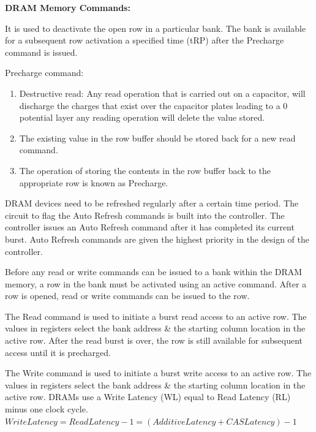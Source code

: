 \textbf{DRAM Memory Commands:}
\begin{description}
    \item [Precharge Command] It is used to deactivate the open row in a particular bank. The bank is available for a subsequent row activation a specified time (tRP) after the Precharge command is issued. 
    \item Precharge command:
    \begin{enumerate}
        \item Destructive read: Any read operation that is carried out on a capacitor, will discharge the charges that exist over the capacitor plates leading to a 0 potential layer \ie any reading operation will delete the value stored.
        \item The existing value in the row buffer should be stored back for a new read command.
        \item The operation of storing the contents in the row buffer back to the appropriate row is known as Precharge.
    \end{enumerate}

    \item [Auto Refresh Command] DRAM devices need to be refreshed regularly after a certain time period. The circuit to flag the Auto Refresh commands is built into the controller. The controller issues an Auto Refresh command after it has completed its current burst. Auto Refresh commands are given the highest priority in the design of the controller. 

    \item [Active Command] Before any read or write commands can be issued to a bank within the DRAM memory, a row in the bank must be activated using an active command. After a row is opened, read or write commands can be issued to the row.

    \item [Read Command] The Read command is used to initiate a burst read access to an active row. The values in registers select the bank address \& the starting column location in the active row. After the read burst is over, the row is still available for subsequent access until it is precharged. 

    \item [Write Command] The Write command is used to initiate a burst write access to an active row. The values in registers select the bank address \& the starting column location in the active row. DRAMs use a Write Latency (WL) equal to Read Latency (RL) minus one clock cycle. \\
    \( Write Latency = Read Latency - 1 = (Additive Latency + CAS Latency) - 1 \)    
\end{description}

